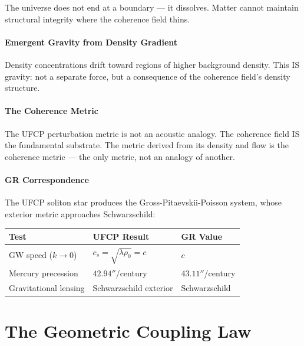 \documentclass[11pt, a4paper]{article}
\begin{document}
The universe does not end at a boundary --- it dissolves. Matter
cannot maintain structural integrity where the coherence field thins.

\subsection{Emergent Gravity from Density Gradient}

Density concentrations drift toward regions of higher background
density. This IS gravity: not a separate force, but a consequence
of the coherence field's density structure.

\subsection{The Coherence Metric}

The UFCP perturbation metric is not an acoustic analogy. The
coherence field IS the fundamental substrate. The metric derived
from its density and flow is the coherence metric --- the only
metric, not an analogy of another.

\subsection{GR Correspondence}

The UFCP soliton star produces the Gross-Pitaevskii-Poisson system,
whose exterior metric approaches Schwarzschild:

\begin{center}
\begin{tabular}{@{}lll@{}}
\toprule
\textbf{Test} & \textbf{UFCP Result} & \textbf{GR Value} \\
\midrule
GW speed ($k \to 0$) & $c_s = \sqrt{\lambda\rho_0} = c$ & $c$ \\
Mercury precession & $42.94''$/century & $43.11''$/century \\
Gravitational lensing & Schwarzschild exterior & Schwarzschild \\
\bottomrule
\end{tabular}
\end{center}

\newpage

\part{The Geometric Coupling Law}
\end{document}
